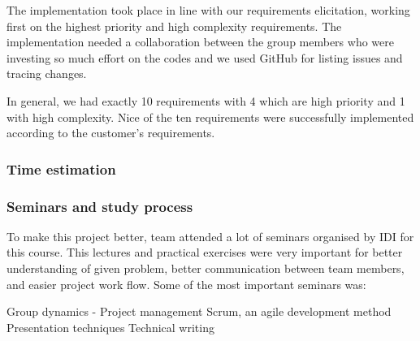 The implementation took place in line with our requirements elicitation, working first on the highest priority and high complexity requirements. The implementation needed a collaboration between the group members who were investing so much effort on the codes and we used GitHub for listing issues and tracing changes.

In general, we had exactly 10 requirements with 4 which are high priority and 1 with high complexity. Nice of the ten requirements were successfully implemented according to the customer's requirements.
	
	\subsubsection{Time estimation}
	
	\subsubsection{Seminars and study process}
	To make this project better, team attended a lot of seminars organised by IDI for this course. This lectures and practical exercises were very important for better understanding of given problem, better communication between team members, and easier project work flow. Some of the most important seminars was:
	
	Group dynamics - \newline
	Project management\newline
	Scrum, an agile development method\newline
	Presentation techniques\newline
	Technical writing\newline


